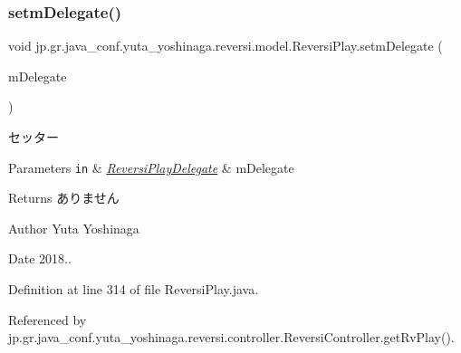 \subsubsection{\texorpdfstring{setm\+Delegate()}{setmDelegate()}}
{\footnotesize\ttfamily void jp.\+gr.\+java\+\_\+conf.\+yuta\+\_\+yoshinaga.\+reversi.\+model.\+Reversi\+Play.\+setm\+Delegate (\begin{DoxyParamCaption}\item[{\hyperlink{classjp_1_1gr_1_1java__conf_1_1yuta__yoshinaga_1_1reversi_1_1model_1_1_reversi_play_delegate}{Reversi\+Play\+Delegate}}]{m\+Delegate }\end{DoxyParamCaption})}



セッター 


\begin{DoxyParams}[1]{Parameters}
\mbox{\tt in}  & {\em \hyperlink{classjp_1_1gr_1_1java__conf_1_1yuta__yoshinaga_1_1reversi_1_1model_1_1_reversi_play_delegate}{Reversi\+Play\+Delegate}} & m\+Delegate \\
\hline
\end{DoxyParams}
\begin{DoxyReturn}{Returns}
ありません 
\end{DoxyReturn}
\begin{DoxyAuthor}{Author}
Yuta Yoshinaga 
\end{DoxyAuthor}
\begin{DoxyDate}{Date}
2018.. 
\end{DoxyDate}


Definition at line 314 of file Reversi\+Play.\+java.



Referenced by jp.\+gr.\+java\+\_\+conf.\+yuta\+\_\+yoshinaga.\+reversi.\+controller.\+Reversi\+Controller.\+get\+Rv\+Play().

